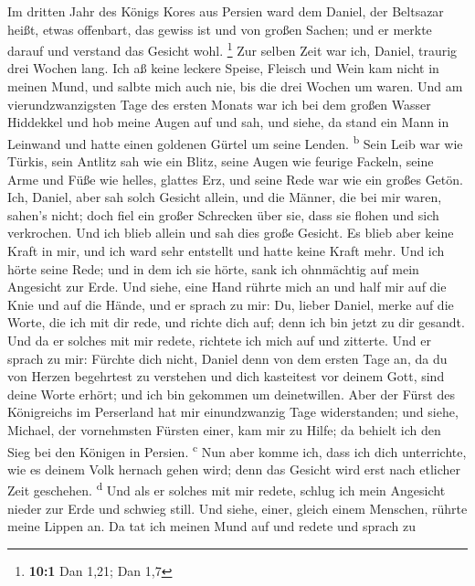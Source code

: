  Im dritten Jahr des Königs Kores aus Persien ward dem
Daniel, der Beltsazar heißt, etwas offenbart, das gewiss ist und von
großen Sachen; und er merkte darauf und verstand das Gesicht wohl.
\footnote{\textbf{10:1} Dan 1,21; Dan 1,7}  Zur selben
Zeit war ich, Daniel, traurig drei Wochen lang.  Ich aß
keine leckere Speise, Fleisch und Wein kam nicht in meinen Mund, und
salbte mich auch nie, bis die drei Wochen um waren.  Und
am vierundzwanzigsten Tage des ersten Monats war ich bei dem großen
Wasser Hiddekkel  und hob meine Augen auf und sah, und
siehe, da stand ein Mann in Leinwand und hatte einen goldenen Gürtel um
seine Lenden. \textsuperscript{b}  Sein Leib war wie
Türkis, sein Antlitz sah wie ein Blitz, seine Augen wie feurige Fackeln,
seine Arme und Füße wie helles, glattes Erz, und seine Rede war wie ein
großes Getön.  Ich, Daniel, aber sah solch Gesicht allein,
und die Männer, die bei mir waren, sahen's nicht; doch fiel ein großer
Schrecken über sie, dass sie flohen und sich verkrochen. 
Und ich blieb allein und sah dies große Gesicht. Es blieb aber keine
Kraft in mir, und ich ward sehr entstellt und hatte keine Kraft mehr.
 Und ich hörte seine Rede; und in dem ich sie hörte, sank
ich ohnmächtig auf mein Angesicht zur Erde.  Und siehe,
eine Hand rührte mich an und half mir auf die Knie und auf die Hände,
 und er sprach zu mir: Du, lieber Daniel, merke auf die
Worte, die ich mit dir rede, und richte dich auf; denn ich bin jetzt zu
dir gesandt. Und da er solches mit mir redete, richtete ich mich auf und
zitterte.  Und er sprach zu mir: Fürchte dich nicht,
Daniel denn von dem ersten Tage an, da du von Herzen begehrtest zu
verstehen und dich kasteitest vor deinem Gott, sind deine Worte erhört;
und ich bin gekommen um deinetwillen.  Aber der Fürst des
Königreichs im Perserland hat mir einundzwanzig Tage widerstanden; und
siehe, Michael, der vornehmsten Fürsten einer, kam mir zu Hilfe; da
behielt ich den Sieg bei den Königen in Persien. \textsuperscript{c}
 Nun aber komme ich, dass ich dich unterrichte, wie es
deinem Volk hernach gehen wird; denn das Gesicht wird erst nach etlicher
Zeit geschehen. \textsuperscript{d}  Und als er solches
mit mir redete, schlug ich mein Angesicht nieder zur Erde und schwieg
still.  Und siehe, einer, gleich einem Menschen, rührte
meine Lippen an. Da tat ich meinen Mund auf und redete und sprach zu
